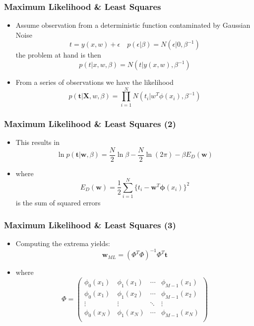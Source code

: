 \documentclass[10pt]{beamer}
\begin{document}
\begin{frame}
  \frametitle{Maximum Likelihood \& Least Squares}
  \begin{itemize}
  \item Assume observation from a deterministic function contaminated
    by Gaussian Noise
    \[
    t = y(x,w) + \epsilon \quad p(\epsilon|\beta) =
    N(\epsilon|0,\beta^{-1})
    \]
    the problem at hand is then
    \[
    p(t|x,w,\beta) = N(t|y(x,w),\beta^{-1})
    \]
  \item From a series of observations we have the likelihood
    \[
    p({\mathbf t}| {\mathbf X}, w, \beta) = \prod_{i=1}^N N(t_i|w^T\phi(x_i),\beta^{-1})
    \]
  \end{itemize}
\end{frame}

\begin{frame}
  \frametitle{Maximum Likelihood \& Least Squares (2)}
  \begin{itemize}
  \item This results in 
    \[
    \ln p({\mathbf t}|{\mathbf w}, \beta ) = \frac{N}{2} \ln \beta -
    \frac{N}{2} \ln (2\pi) - \beta E_D({\mathbf w})
    \]
  \item where
    \[
    E_D({\mathbf w}) = \frac{1}{2} \sum_{i=1}^{N} \{ t_i - {\mathbf
      w}^T{\mathbf \phi}(x_i)\}^2
    \]
    is the sum of squared errors
  \end{itemize}
\end{frame}

\begin{frame}
  \frametitle{Maximum Likelihood \& Least Squares (3)}
  \begin{itemize}
  \item Computing the extrema yields:
    \[
    {\mathbf w}_{ML} = \left( \Phi^T \Phi \right)^{-1} \Phi^T
    {\mathbf t}
    \]
  \item where
    \[
    \Phi = \left(
      \begin{array}{cccc}
        \phi_0(x_1) & \phi_1(x_1) & \cdots & \phi_{M-1}(x_1) \\
        \phi_0(x_1) & \phi_1(x_2) & \cdots & \phi_{M-1}(x_2) \\
        \vdots      & \vdots      & \ddots & \vdots         \\
        \phi_0(x_N) & \phi_1(x_N) & \cdots & \phi_{M-1}(x_N) \\
      \end{array}
    \right)
    \]
  \end{itemize}
\end{frame}
\end{document}
